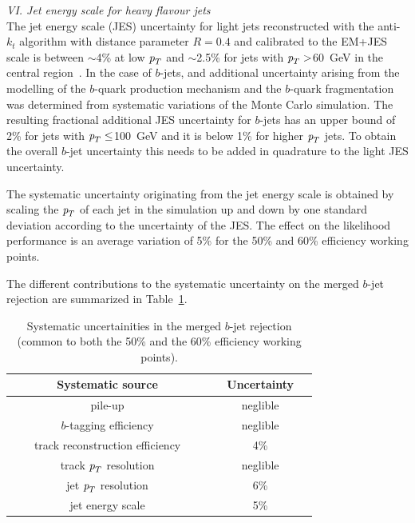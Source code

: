 \vspace{3mm}
{ \em VI. Jet energy scale for heavy flavour jets}
\\[3mm]
The jet energy scale (JES) uncertainty for light jets reconstructed with the anti-$k_t$ algorithm with distance parameter $R=0.4$ and calibrated to the  EM+JES scale is between $\sim$4\% at low ${\emph{p}_{T}}$ and $\sim$2.5\% for jets with  ${\emph{p}_{T}} > $60~GeV in the central region~\cite{bjetJES}. In the case of $b$-jets, and additional uncertainty arising from the modelling of the $b$-quark production mechanism and the $b$-quark fragmentation was determined from systematic variations of the Monte Carlo simulation. %
The resulting fractional additional JES uncertainty for $b$-jets has an upper bound of 2\% for jets with ${\emph{p}_{T}} \leq$100~GeV and it is below 1\% for higher ${\emph{p}_{T}}$ jets. To obtain the overall $b$-jet uncertainty this needs to be added in quadrature to the light JES uncertainty. 

The systematic uncertainty originating from the jet energy scale is obtained by scaling the ${\emph{p}_{T}}$ of each jet in the simulation up and down by one standard deviation according to the uncertainty of the JES. The effect on the likelihood performance is an average variation of 5\% for the 50\% and 60\% efficiency working points. 


\vspace{3mm}
The different contributions to the systematic uncertainty on the merged $b$-jet rejection are summarized in Table~\ref{tb:systematics}.
\begin{table}[!hbt] %
\renewcommand{\arraystretch}{1.2}
\centering
\begin{tabular}{ | c | c |}
\hline
  ~~~~~~~Systematic source~~~~~~~ &~~Uncertainty~~\\ \hline
  pile-up          &  neglible     \\ 
  $b$-tagging efficiency     &  neglible     \\ 
  track reconstruction efficiency  &    4\%        \\ 
  track ${\emph{p}_{T}}$ resolution &  neglible     \\
  jet ${\emph{p}_{T}}$ resolution  &    6\%        \\  
  jet energy scale  &    5\%        \\ \hline 
\end{tabular}
\caption{Systematic uncertainities in the merged $b$-jet rejection (common to both the 50\% and the 60\% efficiency working points).}
\label{tb:systematics}
\end{table}

